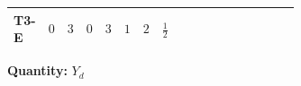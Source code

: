 \documentclass[8pt]{article}
\begin{document}
\begin{landscape}
\begin{longtable}{@{}llcccccc >{\raggedright\arraybackslash}p{0.21\linewidth} >{\raggedright\arraybackslash}p{0.21\linewidth} >{\raggedright\arraybackslash}p{0.21\linewidth}@{}}
\midrule
T3-E & $0$ & $3$ & $0$ & $3$ & $1$ & $2$ & $\frac{1}{2}$ & \scriptsize\adjustbox{max width=\linewidth}{$\begin{gathered} \operatorname{Tr}\!\left({Y_e}\,\left({Y_e}\right)^{\dagger}\right) \left({Y_d}\right)_{ij}\end{gathered}$} & \scriptsize\adjustbox{max width=\linewidth}{$\begin{gathered} +3 \operatorname{Tr}\!\left({Y_u}\,\left({Y_u}\right)^{\dagger}\right) \left({Y_d}\right)_{ij}\end{gathered}$} & \scriptsize\adjustbox{max width=\linewidth}{$\begin{gathered} +3 \operatorname{Tr}\!\left({Y_d}\,\left({Y_d}\right)^{\dagger}\right) \left({Y_d}\right)_{ij}\end{gathered}$} \\
\midrule
\bottomrule
\end{longtable}
\clearpage
\noindent\textbf{Quantity: }$Y_d$\par\smallskip

\end{landscape}
\end{document}
